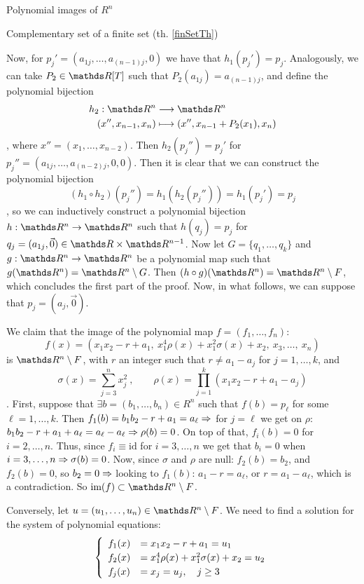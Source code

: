 \documentclass[11pt, a4paper, english, twoside, notitlepage]{report}
\begin{document}
\begin{chapter}{Polynomial images of $R^n$}
\begin{section}{Complementary set of a finite set (th. \ref{finSetTh})}
\begin{Proof}
		Now, for $p_j'=(a_{1j},\dots,a_{(n-1)j},0)$ we have that $h_1(p_j') = p_j$. Analogously, we can take $P_2\in\R[T]$ such that $P_2(a_{1j}) = a_{(n-1)j}$, and define the polynomial bijection
		\begin{align*}
			h_2: \R^n & \longrightarrow \R^n \\
			(x'',x_{n-1},x_n) & \longmapsto (x'',x_{n-1}+P_2(x_1),x_n)
		\end{align*}
		, where $x'' = (x_1, \dots, x_{n-2})$. Then $h_2(p_j'')=p_j'$ for $p_j'' = (a_{1j},\dots,a_{(n-2)j}, 0, 0)$. Then it is clear that we can construct the polynomial bijection 
		$$(h_1\circ h_2)(p_j'') = h_1(h_2(p_j'')) = h_1(p_j') = p_j$$
		, so we can inductively construct a polynomial bijection $h:\R^n\rightarrow\R^n$ such that $h(q_j)=p_j$ for $q_j=(a_{1j},\vec{0}) \in \R\times\R^{n-1}$.  Now let $G=\{q_1,\dots,q_k\}$ and $g:\R^n\rightarrow\R^n$ be a polynomial map such that $g(\R^n)=\R^n\setminus G$. Then $(h\circ g)(\R^n) = \R^n \setminus F$, which concludes the first part of the proof. Now, in what follows, we can suppose that $p_j=(a_j,\vec{0})$.
		
		We claim that the image of the polynomial map $f=(f_1,\dots,f_n)$:
		$$
		f(x)=\left(x_1x_2-r+a_1,\ x_1^{4}\rho(x)+x_1^{2}\sigma(x)+x_2,\ x_3,\dots,\ x_n\right)
		$$
		is $\R^n\setminus F$, with $r$ an integer such that $r \neq a_1 - a_j$ for $j=1, \dots, k$, and 
		$$
		\sigma(x)=\sum_{j=3}^n x_j^2\ , \qquad
		\rho(x)=\prod_{j=1}^k(x_1x_2-r+a_1-a_j)
		$$
		. First, suppose that $\exists b=(b_{1},\dots,b_{n}) \in R^n$ such that $f(b)=p_\ell$ for some $\ell=1, \dots, k$. Then $f_1(b)=b_1b_2 - r + a_1 = a_\ell \Rightarrow$ for $j = \ell$ we get on $\rho$: $b_1b_2 - r + a_1 + a_\ell = a_\ell - a_\ell \Rightarrow \rho(b) = 0$. On top of that, $f_i(b)=0$ for $i = 2, \dots, n$. Thus, since $f_i \equiv \text{id}$ for $i = 3, \dots, n$ we get that $b_i = 0$ when $i = 3, \dots, n \Rightarrow \sigma(b) = 0$. Now, since $\sigma$ and $\rho$ are null: $f_2(b) = b_2$, and $f_2(b) = 0$, so $b_2 = 0 \Rightarrow$ looking to $f_1(b)$: $a_1 - r = a_\ell$, or $r = a_1-a_\ell$, which is a contradiction. So $\text{im}(f)\subset \R^n\setminus F$.
				
		Conversely, let $u=(u_1,\dots,u_n)\in\R^n\setminus F$. We need to find a solution for the system of polynomial equations:
		\[ \left\{ \def\arraystretch{1.2}
		\begin{array}{ll} 
			f_1(x) & = x_1 x_2 - r + a_1 = u_1 \\
			f_2(x) & = x_1^4 \rho(x) + x_1^2 \sigma(x) + x_2 = u_2 \\
			f_j(x) & = x_j = u_j, \quad j \geq 3
		\end{array} 
		\right.  \]
		\begin{enumerate}[(i)]
		

\end{enumerate}
\end{Proof}
\end{section}
\end{chapter}
\end{document}

